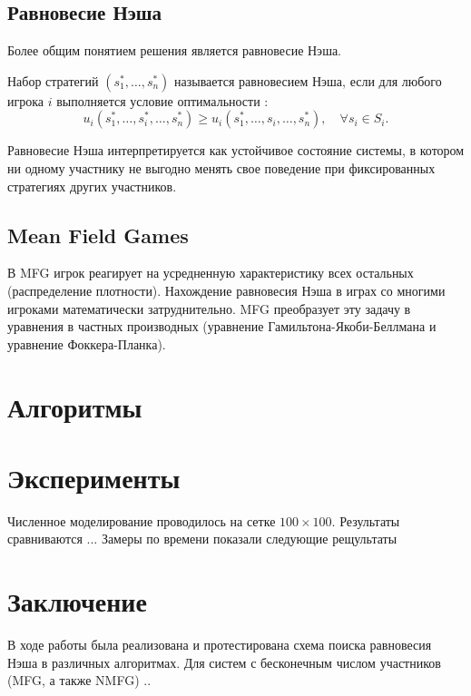 \documentclass[a4paper,11pt]{article}
\begin{document}
\subsection{Равновесие Нэша}

Более общим понятием решения является равновесие Нэша.

\begin{definition}
Набор стратегий $(s_1^*, \dots, s_n^*)$ называется равновесием Нэша, если для любого игрока $i$ выполняется условие оптимальности \cite{gibbons1992game}:
\begin{equation}
u_i(s_1^*, \dots, s_i^*, \dots, s_n^*) \geq u_i(s_1^*, \dots, s_i, \dots, s_n^*), \quad \forall s_i \in S_i.
\end{equation}
\end{definition}


Равновесие Нэша интерпретируется как устойчивое состояние системы, в котором ни одному участнику не выгодно менять свое поведение при фиксированных стратегиях других участников.

\subsection{Mean Field Games}

В MFG игрок реагирует на усредненную характеристику всех остальных (распределение плотности). Нахождение равновесия Нэша в играх со многими игроками математически затруднительно. MFG преобразует эту задачу в уравнения в частных производных (уравнение Гамильтона-Якоби-Беллмана и уравнение Фоккера-Планка).
 

\section{Алгоритмы}










\section{Эксперименты}
Численное моделирование проводилось на сетке $100 \times 100$. Результаты сравниваются ...
Замеры по времени показали следующие рещультаты

\section{Заключение}
В ходе работы была реализована и протестирована схема поиска равновесия Нэша в различных алгоритмах. Для систем с бесконечным числом участников (MFG, а также NMFG) ..

\printbibliography
\end{document}
